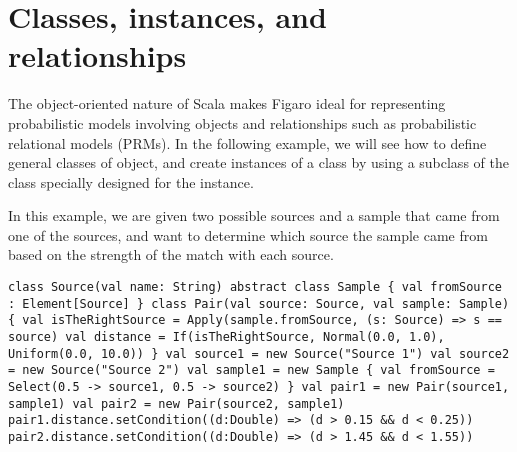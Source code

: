 \section{Classes, instances, and relationships}

The object-oriented nature of Scala makes Figaro ideal for representing probabilistic models involving objects and relationships such as probabilistic relational models (PRMs). 
In the following example, we will see how to define general classes of object, and create instances of a class by using a subclass of the class specially designed for the instance.

In this example, we are given two possible sources and a sample that came from one of the sources, and want to determine which source the sample came from based on the strength of the match with each
source.

\begin{flushleft}
\texttt{class Source(val name: String)
\newline
\newline abstract class Sample \{
\newline \tab val fromSource : Element[Source] 
\newline \}
\newline
\newline class Pair(val source: Source, val sample: Sample) \{
\newline \tab val isTheRightSource = Apply(sample.fromSource, (s: Source) => s == source)
\newline \tab val distance = If(isTheRightSource, 
\newline \tab Normal(0.0, 1.0), 
\newline \tab Uniform(0.0, 10.0))
\newline \}
\newline
{}
\newline val source1 = new Source("Source 1") 
\newline val source2 = new Source("Source 2") 
\newline val sample1 = new Sample \{ 
\newline val fromSource = Select(0.5 -> source1, 0.5 -> source2)
\newline \}
\newline val pair1 = new Pair(source1, sample1)
\newline val pair2 = new Pair(source2, sample1)
\newline 
\newline pair1.distance.setCondition((d:Double) => (d > 0.15 \&\& d < 0.25))
\newline pair2.distance.setCondition((d:Double) => (d > 1.45 \&\& d < 1.55)) }
\end{flushleft}

